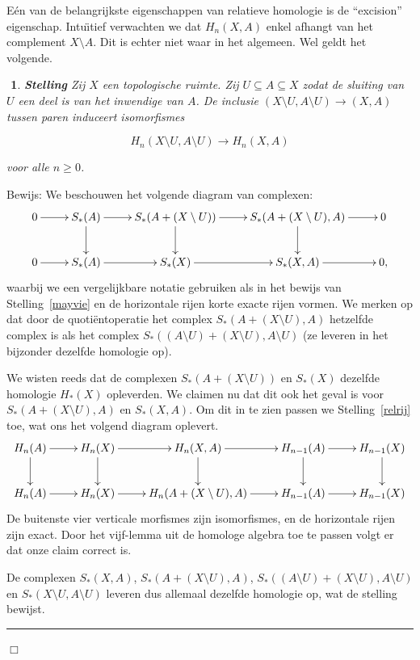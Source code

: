\documentclass[12pt]{book}
\newcommand{\bew}{{\sc Bewijs: }}
\newcommand{\B}{\rule{1mm}{0mm} \hfill $\Box$ }
\newtheorem{stelh}{$\!\!$}[section]
\newenvironment{stel}{\begin{stelh}{\em {\bf Stelling }}}{\end{stelh}}
\begin{document}
E\'en van de belangrijkste eigenschappen van relatieve homologie is de ``excision'' eigenschap. Intu\"{\i}tief verwachten we dat $H_n(X,A)$ enkel afhangt van het complement $X\setminus A$. Dit is echter niet waar in het algemeen. Wel geldt het volgende.

\begin{stel} Zij $X$ een topologische ruimte. Zij $U\subseteq A\subseteq X$ zodat de sluiting van $U$
een deel is van het inwendige van $A$. De inclusie $(X\setminus U, A\setminus U)\to (X,A)$ tussen
paren induceert isomorfismes

$$H_{n}(X\setminus U, A\setminus U)\to H_{n}(X,A)$$

voor alle $n\geq 0$.
\end{stel}
\bew
We beschouwen het volgende diagram van complexen:
$$
 \xymatrix{ 
0 \ar[r] & S_{*}(A) \ar[r] \ar[d] &  S_{*}(A + (X \setminus U) ) \ar[r] \ar[d] & S_{*}(A + (X \setminus U) ,A) \ar[r] \ar[d] & 0 \\
0  \ar[r] & S_{*}(A) \ar[r]  &  S_{*}( X )  \ar[r]  & S_{*}( X ,A)  \ar[r] & 0,
}
$$
waarbij we een vergelijkbare notatie gebruiken als in het bewijs van Stelling~\ref{mayvie} en de horizontale rijen korte exacte rijen vormen. We merken op dat door de quoti\"entoperatie het complex $S_{*}(A + (X \setminus U) ,A)$ hetzelfde complex is als het complex $S_{*}((A \setminus U) + (X \setminus U) , A \setminus U)$ (ze leveren in het bijzonder dezelfde homologie op).

We wisten reeds dat de complexen $S_{*}(A + (X \setminus U) )$ en $S_{*}( X )$ dezelfde homologie $H_*(X)$ opleverden. We claimen nu dat dit ook het geval is voor $S_{*}(A + (X \setminus U) ,A)$ en $S_{*}( X ,A)$. Om dit in te zien passen we Stelling~\ref{relrij} toe, wat ons het volgend diagram oplevert.
$$
 \xymatrix{ 
H_{n}(A) \ar[r] \ar[d] &  H_{n}(X) \ar[r] \ar[d] &  H_{n}(X,A) \ar[r] \ar[d] & H_{n-1}(A) \ar[r] \ar[d] &  H_{n-1}(X) \ar[d] \\
H_{n}(A) \ar[r]  &  H_{n}(X) \ar[r] &  H_{n}(A+(X\setminus U),A) \ar[r]  & H_{n-1}(A) \ar[r]  &  H_{n-1}(X) 
}
$$
De buitenste vier verticale morfismes zijn isomorfismes, en de horizontale rijen zijn exact. Door het vijf-lemma uit de homologe algebra toe te passen volgt er dat onze claim correct is.

De complexen $S_{*}( X ,A)$, $S_{*}(A + (X \setminus U) ,A)$, $S_{*}((A \setminus U) + (X \setminus U) , A \setminus U)$ en $S_{*}( X \setminus U,A \setminus U)$ leveren dus  allemaal dezelfde homologie op, wat de stelling bewijst.
\B
\end{document}
